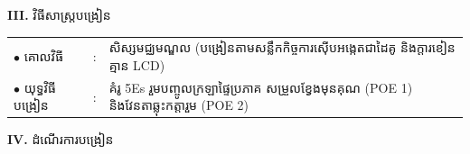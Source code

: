 \documentclass[a4paper,10pt]{article}
\newcommand{\en}[1]{{\TimesEn #1}}
\begin{document}
{\vspace{2pt}

\textbf{III.} {\muol វិធីសាស្រ្តបង្រៀន}\\[1pt]
\hspace*{0.45cm}%
\begin{tabular}{@{}l l L{14.85cm}@{}}
  $\bullet$ \hspace{0.25cm} គោលវិធី & : & សិស្សមជ្ឈមណ្ឌល (បង្រៀនតាមសន្លឹកកិច្ចការស៊ើបអង្កេតជាដៃគូ និងក្ដារខៀន គ្មាន \en{LCD}) \\
  $\bullet$ \hspace{0.25cm} យុទ្ធវិធីបង្រៀន & : & គំរូ \en{5Es} រួមបញ្ចូលក្រឡាផ្ទៃប្រភាគ សម្រួលខ្វែងមុនគុណ \en{(POE 1)} និងវែនតាឆ្លុះកត្តារួម \en{(POE 2)} \\
\end{tabular}
}

\vspace{2pt}

\textbf{IV.} {\muol ដំណើរការបង្រៀន}

\vspace{1pt}
\end{document}
